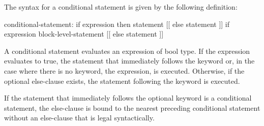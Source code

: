 The syntax for a conditional statement is given by the following
definition:
\begin{syntax}
conditional-statement:
  if expression then statement [[ else statement ]]
  if expression block-level-statement [[ else statement ]]
\end{syntax}

A conditional statement evaluates an expression of bool type.  If the
expression evaluates to true, the statement that immediately follows
the  keyword or, in the case where there is no 
keyword, the expression, is executed.  Otherwise, if the optional
else-clause exists, the statement following the  keyword is
executed.


If the statement that immediately follows the optional 
keyword is a conditional statement, the else-clause is bound to the
nearest preceding conditional statement without an else-clause that is
legal syntactically.
